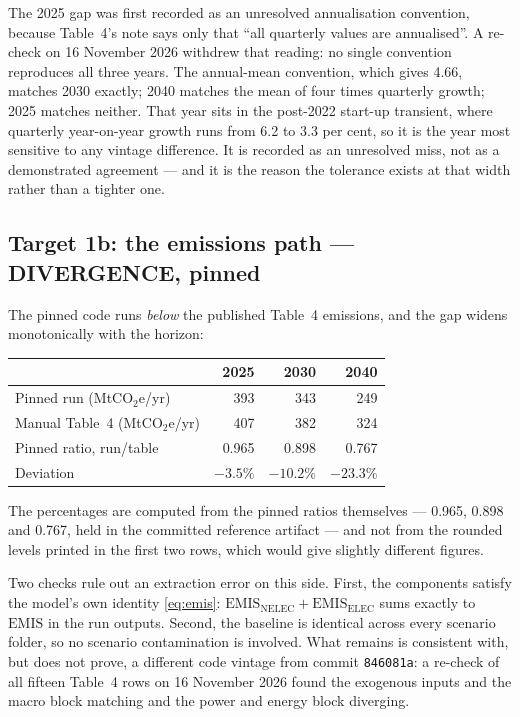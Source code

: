 The 2025 gap was first recorded as an unresolved annualisation convention, because Table~4's note says only that ``all quarterly values are annualised''. A re-check on 16 November 2026 withdrew that reading: no single convention reproduces all three years. The annual-mean convention, which gives 4.66, matches 2030 exactly; 2040 matches the mean of four times quarterly growth; 2025 matches neither. That year sits in the post-2022 start-up transient, where quarterly year-on-year growth runs from 6.2 to 3.3 per cent, so it is the year most sensitive to any vintage difference. It is recorded as an unresolved miss, not as a demonstrated agreement --- and it is the reason the tolerance exists at that width rather than a tighter one.

\subsection{Target 1b: the emissions path --- DIVERGENCE, pinned}
\label{sec:target1b}

The pinned code runs \emph{below} the published Table~4 emissions, and the gap widens monotonically with the horizon:

\begin{center}
\begin{tabular}{@{}lrrr@{}}
\toprule
& 2025 & 2030 & 2040 \\
\midrule
Pinned run (MtCO$_2$e/yr) & 393 & 343 & 249 \\
Manual Table~4 (MtCO$_2$e/yr) & 407 & 382 & 324 \\
Pinned ratio, run/table & 0.965 & 0.898 & 0.767 \\
Deviation & $-3.5\%$ & $-10.2\%$ & $-23.3\%$ \\
\bottomrule
\end{tabular}
\end{center}

\noindent The percentages are computed from the pinned ratios themselves --- 0.965, 0.898 and 0.767, held in the committed reference artifact --- and not from the rounded levels printed in the first two rows, which would give slightly different figures.

Two checks rule out an extraction error on this side. First, the components satisfy the model's own identity \eqref{eq:emis}: $\mathrm{EMIS}_{\mathrm{NELEC}} + \mathrm{EMIS}_{\mathrm{ELEC}}$ sums exactly to $\mathrm{EMIS}$ in the run outputs. Second, the baseline is identical across every scenario folder, so no scenario contamination is involved. What remains is consistent with, but does not prove, a different code vintage from commit \texttt{846081a}: a re-check of all fifteen Table~4 rows on 16 November 2026 found the exogenous inputs and the macro block matching and the power and energy block diverging.

